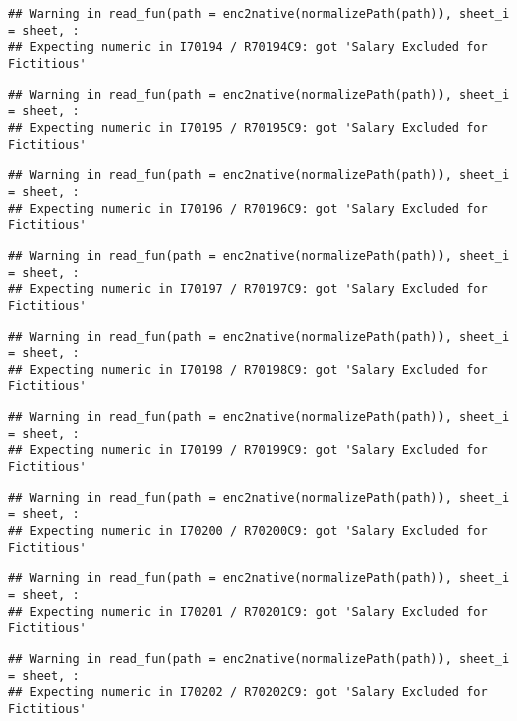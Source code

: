 \documentclass[
]{article}
\begin{document}
\begin{verbatim}
## Warning in read_fun(path = enc2native(normalizePath(path)), sheet_i = sheet, :
## Expecting numeric in I70194 / R70194C9: got 'Salary Excluded for Fictitious'
\end{verbatim}

\begin{verbatim}
## Warning in read_fun(path = enc2native(normalizePath(path)), sheet_i = sheet, :
## Expecting numeric in I70195 / R70195C9: got 'Salary Excluded for Fictitious'
\end{verbatim}

\begin{verbatim}
## Warning in read_fun(path = enc2native(normalizePath(path)), sheet_i = sheet, :
## Expecting numeric in I70196 / R70196C9: got 'Salary Excluded for Fictitious'
\end{verbatim}

\begin{verbatim}
## Warning in read_fun(path = enc2native(normalizePath(path)), sheet_i = sheet, :
## Expecting numeric in I70197 / R70197C9: got 'Salary Excluded for Fictitious'
\end{verbatim}

\begin{verbatim}
## Warning in read_fun(path = enc2native(normalizePath(path)), sheet_i = sheet, :
## Expecting numeric in I70198 / R70198C9: got 'Salary Excluded for Fictitious'
\end{verbatim}

\begin{verbatim}
## Warning in read_fun(path = enc2native(normalizePath(path)), sheet_i = sheet, :
## Expecting numeric in I70199 / R70199C9: got 'Salary Excluded for Fictitious'
\end{verbatim}

\begin{verbatim}
## Warning in read_fun(path = enc2native(normalizePath(path)), sheet_i = sheet, :
## Expecting numeric in I70200 / R70200C9: got 'Salary Excluded for Fictitious'
\end{verbatim}

\begin{verbatim}
## Warning in read_fun(path = enc2native(normalizePath(path)), sheet_i = sheet, :
## Expecting numeric in I70201 / R70201C9: got 'Salary Excluded for Fictitious'
\end{verbatim}

\begin{verbatim}
## Warning in read_fun(path = enc2native(normalizePath(path)), sheet_i = sheet, :
## Expecting numeric in I70202 / R70202C9: got 'Salary Excluded for Fictitious'
\end{verbatim}
\end{document}
